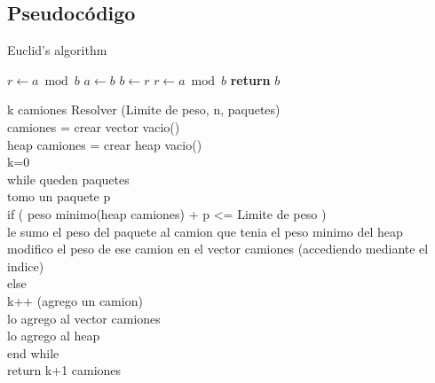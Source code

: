 \subsection{Pseudoc\'odigo}
\begin{algorithm}
\caption{Euclid’s algorithm}\label{euclid}
\begin{algorithmic}[1]
\State $r\gets a\bmod b$
\State $a\gets b$
\State $b\gets r$
\State $r\gets a\bmod b$
\EndWhile\label{euclidendwhile}
\State \textbf{return} $b$
\EndProcedure
\end{algorithmic}
\end{algorithm}

k camiones Resolver (Limite de peso, n, paquetes)\\
camiones = crear vector vacio()\\
heap camiones = crear heap vacio()\\
k=0\\
while queden paquetes\\

	tomo un paquete p\\
	
	if ( peso minimo(heap camiones) + p <= Limite de peso )\\
	
		le sumo el peso del paquete al camion que tenia el peso minimo del heap\\
		
		modifico el peso de ese camion en el vector camiones (accediendo mediante el
		 indice)\\
		 
	else\\
	
		k++ (agrego un camion)\\
		
		lo agrego al vector camiones\\
		
		lo agrego al heap\\
		
end while\\
return k+1 camiones\\
